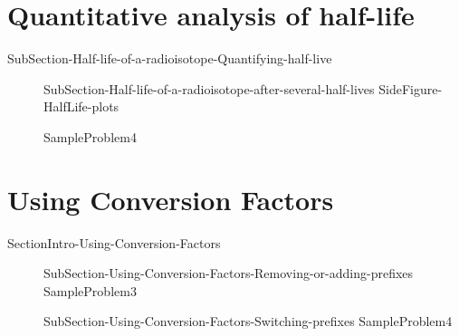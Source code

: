 \documentclass[main.tex]{subfiles}
\begin{document}
\section{\faFlash Quantitative analysis of half-life}

 {SubSection-Half-life-of-a-radioisotope-Quantifying-half-live}
\sloppy \begin{description}
\item[] {SubSection-Half-life-of-a-radioisotope-after-several-half-lives}
{SideFigure-HalfLife-plots}

  {SampleProblem4}
  \end{description}


 
 
 
 

\section{\faGears Using Conversion Factors}
{SectionIntro-Using-Conversion-Factors}
\sloppy\begin{description}
\item[]{SubSection-Using-Conversion-Factors-Removing-or-adding-prefixes}
{SampleProblem3}
\item[]{SubSection-Using-Conversion-Factors-Switching-prefixes}
{SampleProblem4}
\end{description}
 


\clearpage\thispagestyle{empty}\mbox{}\clearpage
\end{document}
